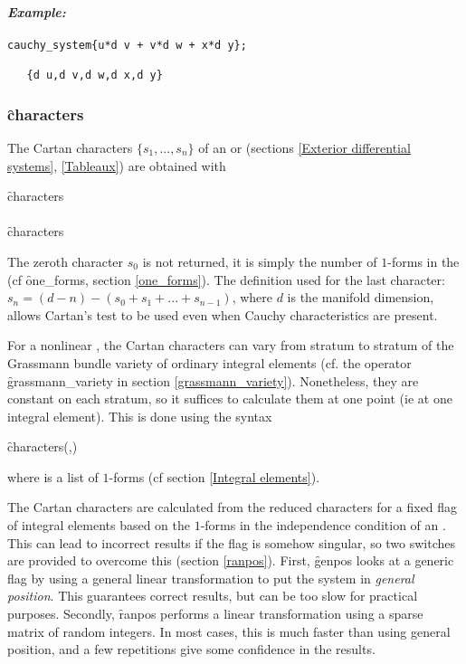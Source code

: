 \paragraph{\textit{Example:}}
\begin{verbatim}
cauchy_system{u*d v + v*d w + x*d y};

   {d u,d v,d w,d x,d y}
\end{verbatim}

\subsubsection{\f{characters}}
\label{characters}

\hypertarget{operator:CHARACTERS}{}
The Cartan characters $\{s_1,...,s_n\}$ of an  or 
(sections \ref{Exterior differential systems}, \ref{Tableaux}) are obtained
with
\begin{syntaxtable}
  \f{characters} \\
  \\
  \f{characters} 
\end{syntaxtable}
The zeroth character $s_0$ is not returned, it is simply the number of
$1$-forms in the  (cf \f{one\_forms}, section \ref{one_forms}). The
definition used for the last character: $s_n = (d - n) - (s_0 + s_1 + ... +
s_{n-1})$, where $d$ is the manifold dimension, allows Cartan's test to be
used even when Cauchy characteristics are present.

For a nonlinear , the Cartan characters can vary from stratum to
stratum of the Grassmann bundle variety of ordinary integral elements (cf. the operator
\f{grassmann\_variety} in section \ref{grassmann_variety}). Nonetheless,
they are constant on each stratum, so it suffices to calculate them at one
point (ie at one integral element). This is done using the syntax
\begin{syntax}
	\f{characters}(,)
\end{syntax}
where  is a list of $1$-forms (cf section
\ref{Integral elements}).

The Cartan characters are calculated from the reduced characters for a
fixed flag of integral elements based on the $1$-forms in the independence
condition of an . This can lead to incorrect results if the flag
is somehow singular, so two switches are provided to overcome this (section
\ref{ranpos}). First, \f{genpos} looks at a generic flag by using a general
linear transformation to put the system in \emph{general position}. This
guarantees correct results, but can be too slow for practical
purposes. Secondly, \f{ranpos} performs a linear transformation using a
sparse matrix of random integers. In most cases, this is much faster than
using general position, and a few repetitions give some confidence in the
results.

